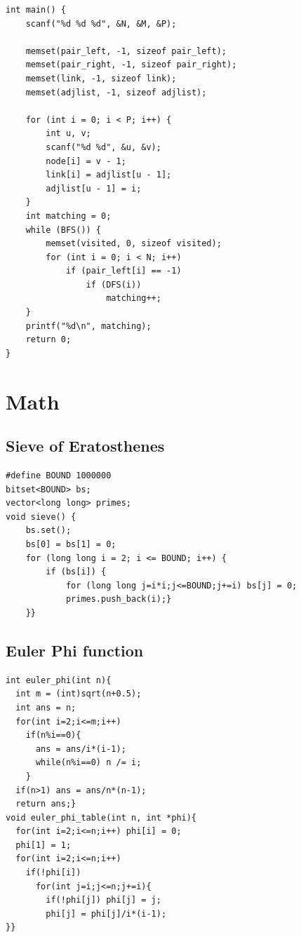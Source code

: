 \documentclass[10pt,landscape]{article}
\begin{document}
\begin{multicols}{2}
\begin{lstlisting}
int main() {
    scanf("%d %d %d", &N, &M, &P);

    memset(pair_left, -1, sizeof pair_left);
    memset(pair_right, -1, sizeof pair_right);
    memset(link, -1, sizeof link);
    memset(adjlist, -1, sizeof adjlist);
 
    for (int i = 0; i < P; i++) {
        int u, v;
        scanf("%d %d", &u, &v);
        node[i] = v - 1;
        link[i] = adjlist[u - 1];
        adjlist[u - 1] = i;
    }
    int matching = 0;
    while (BFS()) {
        memset(visited, 0, sizeof visited);
        for (int i = 0; i < N; i++)
            if (pair_left[i] == -1)
                if (DFS(i))
                    matching++;
    }
    printf("%d\n", matching);
    return 0;
}
\end{lstlisting}

\section{Math}
\subsection{Sieve of Eratosthenes}
\begin{lstlisting}
#define BOUND 1000000
bitset<BOUND> bs;
vector<long long> primes;
void sieve() {
    bs.set();
    bs[0] = bs[1] = 0;
    for (long long i = 2; i <= BOUND; i++) {
        if (bs[i]) {
            for (long long j=i*i;j<=BOUND;j+=i) bs[j] = 0;
            primes.push_back(i);}
    }}
\end{lstlisting}

\subsection{Euler Phi function}
\begin{lstlisting}
int euler_phi(int n){
  int m = (int)sqrt(n+0.5);
  int ans = n;
  for(int i=2;i<=m;i++)
    if(n%i==0){
      ans = ans/i*(i-1);
      while(n%i==0) n /= i;
    }
  if(n>1) ans = ans/n*(n-1);
  return ans;}
void euler_phi_table(int n, int *phi){
  for(int i=2;i<=n;i++) phi[i] = 0;
  phi[1] = 1;
  for(int i=2;i<=n;i++)
    if(!phi[i])
      for(int j=i;j<=n;j+=i){
        if(!phi[j]) phi[j] = j;
        phi[j] = phi[j]/i*(i-1);
}}
\end{lstlisting}


\end{multicols}
\end{document}
